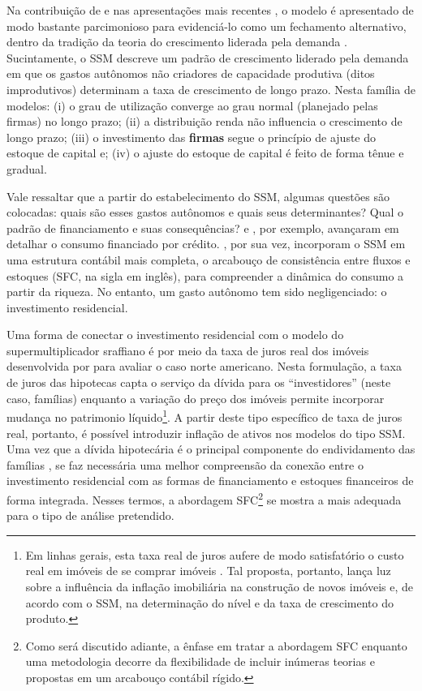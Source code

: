 Na contribuição de \textcite{serrano_sraffian_1995} e nas apresentações mais recentes \cite{freitas_growth_2015}, o modelo é apresentado de modo bastante parcimonioso para evidenciá-lo como um fechamento alternativo, dentro da tradição da teoria do crescimento liderada pela demanda \cite{serrano_sraffian_2017}. 
Sucintamente, o SSM descreve um padrão de crescimento liderado pela demanda em que os gastos autônomos não criadores de capacidade produtiva (ditos improdutivos) determinam a taxa de crescimento de longo prazo. 
Nesta família de modelos: 
(i) o grau de utilização converge ao grau normal (planejado pelas firmas) no longo prazo; 
(ii) a distribuição renda não influencia o crescimento de longo prazo; 
(iii) o investimento das \textbf{firmas} segue o princípio de ajuste do estoque de capital e;
(iv) o ajuste do estoque de capital é feito de forma tênue e gradual. 






Vale ressaltar que a partir do estabelecimento do SSM, algumas questões são colocadas: quais são esses gastos autônomos e quais seus determinantes? Qual o padrão de financiamento e suas consequências? \textcite{pariboni_household_2016} e \textcite{fagundes_dinamica_2017}, por exemplo, avançaram em detalhar o consumo financiado por crédito.  \textcite{brochier_supermultiplier_2018}, por sua vez, incorporam o SSM em uma estrutura contábil mais completa, o arcabouço de consistência entre fluxos e estoques (SFC, na sigla em inglês), para compreender a dinâmica do consumo a partir da riqueza. No entanto, um gasto autônomo tem sido negligenciado: o investimento residencial. 

Uma forma de conectar o investimento residencial com o modelo do supermultiplicador sraffiano é por meio da taxa de juros real dos imóveis desenvolvida por \textcite{teixeira_crescimento_2015} para avaliar o caso norte americano. Nesta formulação, a taxa de juros das hipotecas capta o serviço da dívida para os ``investidores'' (neste caso, famílias) enquanto a variação do preço dos imóveis permite incorporar mudança no patrimonio líquido\footnote{Em linhas gerais, esta taxa real de juros aufere de modo satisfatório o custo real em imóveis de se comprar imóveis \cite[p.~53]{teixeira_crescimento_2015}. Tal proposta, portanto, lança luz sobre a influência da inflação imobiliária na construção de novos imóveis e, de acordo com o SSM, na determinação do nível e da taxa de crescimento do produto.}. 
A partir deste tipo específico de taxa de juros real, portanto, é possível introduzir inflação de ativos nos modelos do tipo SSM. 
Uma vez que a dívida hipotecária é o principal componente do endividamento das famílias \cite{van_gunten_varieties_2018}, se faz necessária uma melhor compreensão da conexão entre o investimento residencial com as formas de financiamento e estoques financeiros de forma integrada.
Nesses termos, a abordagem SFC\footnote{Como será discutido adiante, a ênfase em tratar a abordagem SFC enquanto uma metodologia decorre da flexibilidade de incluir inúmeras teorias e propostas em um arcabouço contábil rígido. } se mostra a mais adequada para o tipo de análise pretendido. 


